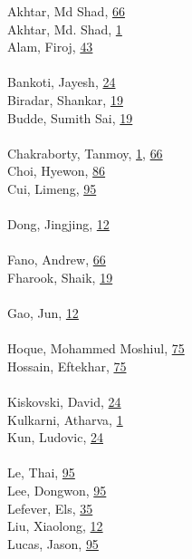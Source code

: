 \documentclass[11pt,oneside]{book}
\begin{document}
\begin{multicols}{2}
Akhtar, Md Shad, \hyperlink{page.66}{66}\\
Akhtar, Md. Shad, \hyperlink{page.1}{1}\\
Alam, Firoj, \hyperlink{page.43}{43}\\
\\ %
Bankoti, Jayesh, \hyperlink{page.24}{24}\\
Biradar, Shankar, \hyperlink{page.19}{19}\\
Budde, Sumith Sai, \hyperlink{page.19}{19}\\
\\ %
Chakraborty, Tanmoy, \hyperlink{page.1}{1}, \hyperlink{page.66}{66}\\
Choi, Hyewon, \hyperlink{page.86}{86}\\
Cui, Limeng, \hyperlink{page.95}{95}\\
\\ %
Dong, Jingjing, \hyperlink{page.12}{12}\\
\\ %
Fano, Andrew, \hyperlink{page.66}{66}\\
Fharook, Shaik, \hyperlink{page.19}{19}\\
\\ %
Gao, Jun, \hyperlink{page.12}{12}\\
\\ %
Hoque, Mohammed Moshiul, \hyperlink{page.75}{75}\\
Hossain, Eftekhar, \hyperlink{page.75}{75}\\
\\ %
Kiskovski, David, \hyperlink{page.24}{24}\\
Kulkarni, Atharva, \hyperlink{page.1}{1}\\
Kun, Ludovic, \hyperlink{page.24}{24}\\
\\ %
Le, Thai, \hyperlink{page.95}{95}\\
Lee, Dongwon, \hyperlink{page.95}{95}\\
Lefever, Els, \hyperlink{page.35}{35}\\
Liu, Xiaolong, \hyperlink{page.12}{12}\\
Lucas, Jason, \hyperlink{page.95}{95}\\
\\ %

\end{multicols}
\end{document}
